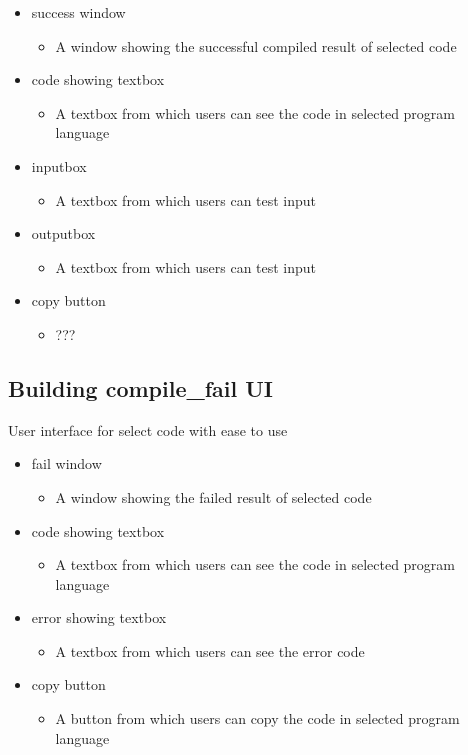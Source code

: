 \documentclass[conference]{IEEEtran}
\begin{document}
\begin{itemize}
  \item success window
  \begin{itemize}
    \item A window showing the successful compiled result of selected code
  \end{itemize}
  \item code showing textbox
  \begin{itemize}
    \item A textbox from which users can see the code in selected program language
  \end{itemize}
  \item inputbox
  \begin{itemize}
    \item A textbox from which users can test input
  \end{itemize}
  \item outputbox
  \begin{itemize}
    \item A textbox from which users can test input
  \end{itemize}
  \item copy button
  \begin{itemize}
    \item ???
  \end{itemize}
\end{itemize}
\textit{ }


\subsection{Building compile\_fail UI}
 User interface for select code with ease to use

\begin{itemize}
  \item fail window
  \begin{itemize}
    \item A window showing the failed result of selected code
  \end{itemize}
  \item code showing textbox
  \begin{itemize}
    \item A textbox from which users can see the code in selected program language
  \end{itemize}
  \item error showing textbox
  \begin{itemize}
    \item A textbox from which users can see the error code
  \end{itemize}
  \item copy button
  \begin{itemize}
    \item A button from which users can copy the code in selected program language
  \end{itemize}
\end{itemize}
\textit{ }
\end{document}
